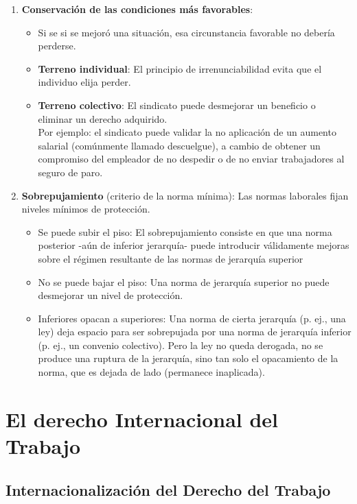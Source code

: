\documentclass[spanish,12pt,a4paper,titlepage]{report}
\begin{document}
\begin{enumerate}
\item \textbf{Conservación de las condiciones más favorables}:
  \begin{itemize}
  \item Si se si se mejoró una situación, esa circunstancia favorable no debería perderse.
  \item \textbf{Terreno individual}: El principio de irrenunciabilidad evita que el individuo elija perder.
  \item \textbf{Terreno colectivo}: El sindicato puede desmejorar un beneficio o eliminar un derecho adquirido. \\
    Por ejemplo: el sindicato puede validar la no aplicación de un aumento salarial (comúnmente llamado descuelgue), a cambio de obtener un compromiso del empleador de no despedir o de no enviar trabajadores al seguro de paro.
  \end{itemize}
\item \textbf{Sobrepujamiento} (criterio de la norma mínima): Las normas laborales fijan niveles mínimos de protección.
  \begin{itemize}
  \item Se puede subir el piso: El sobrepujamiento consiste en que una norma posterior -aún de inferior jerarquía- puede introducir válidamente mejoras sobre el régimen resultante de las normas de jerarquía superior
  \item No se puede bajar el piso: Una norma de jerarquía superior no puede desmejorar un nivel de protección.
  \item Inferiores opacan a superiores: Una norma de cierta jerarquía (p. ej., una ley) deja espacio para ser sobrepujada por una norma de jerarquía inferior (p. ej., un convenio colectivo). Pero la ley no queda derogada, no se produce una ruptura de la jerarquía, sino tan solo el opacamiento de la norma, que es dejada de lado (permanece inaplicada). 
  \end{itemize}
\end{enumerate}

\part{El derecho Internacional del Trabajo}
\label{part:el-derecho-internacional-del-trabajo}

\chapter{Internacionalización del Derecho del Trabajo}
\label{chap:Internacionalizacion-del-Derecho-del-Trabajo}
\end{document}
